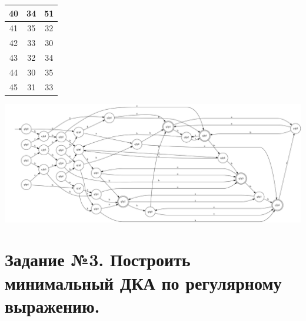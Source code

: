 \documentclass{article}
\begin{document}
\begin{enumerate}
\begin{center}
\begin{tabular}{ |c|c|c| }
            40 & 34 & 51\\
            \hline
            41 & 35 & 32\\
            \hline
            42 & 33 & 30\\
            \hline
            43 & 32 & 34\\
            \hline
            44 & 30 & 35\\
            \hline
            45 & 31 & 33\\
            \hline
            \end{tabular}
        \end{center} 
\begin{center}
    \includegraphics[width=1\textwidth]{g25.png}
\end{center}
\end{enumerate}









\section{Задание №3. Построить минимальный ДКА по регулярному выражению.}
\end{document}
